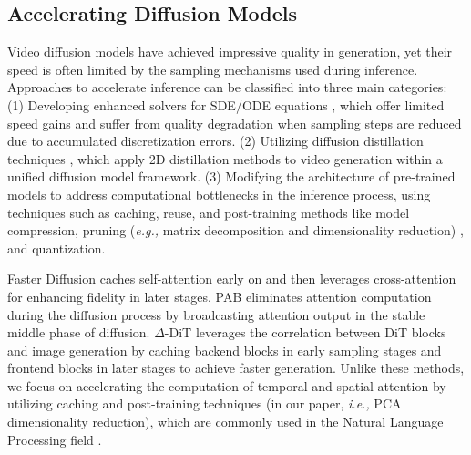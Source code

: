 \subsection{Accelerating Diffusion Models}
Video diffusion models have achieved impressive quality in generation, yet their speed is often limited by the sampling mechanisms used during inference. Approaches to accelerate inference can be classified into three main categories: 
(1) Developing enhanced solvers for SDE/ODE equations \cite{lu2022dpm}, which offer limited speed gains and suffer from quality degradation when sampling steps are reduced due to accumulated discretization errors. 
(2) Utilizing diffusion distillation techniques \cite{yin2024onestep}, which apply 2D distillation methods to video generation within a unified diffusion model framework. 
(3) Modifying the architecture of pre-trained models to address computational bottlenecks in the inference process, using techniques such as caching, reuse, and post-training methods like model compression, pruning (\textit{e.g.,} matrix decomposition and dimensionality reduction) \cite{ashkboos2024slicegpt}, and quantization.

Faster Diffusion \cite{li2023faster} caches self-attention early on and then leverages cross-attention for enhancing fidelity in later stages.
PAB \cite{zhao2024pab} eliminates attention computation during the diffusion process by broadcasting attention output in the stable middle phase of diffusion.
$\Delta$-DiT \cite{chen2024delta} leverages the correlation between DiT blocks and image generation by caching backend blocks in early sampling stages and frontend blocks in later stages to achieve faster generation.
Unlike these methods, we focus on accelerating the computation of temporal and spatial attention by utilizing caching and post-training techniques (in our paper, \textit{i.e.,} PCA dimensionality reduction), which are commonly used in the Natural Language Processing field \cite{ashkboos2024slicegpt}.





